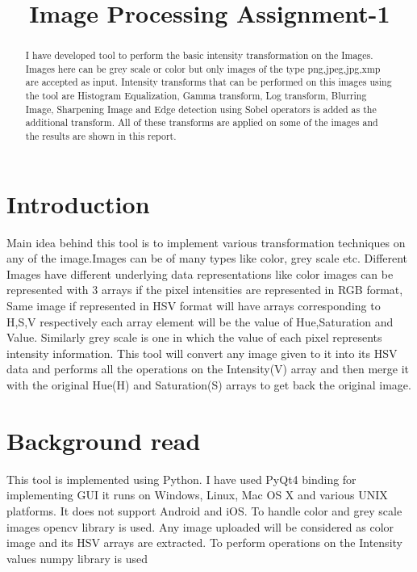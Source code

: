 \documentclass{article}
\title{Image Processing Assignment-1}
\begin{document}
%
\maketitle
%
\begin{abstract}
I have developed tool to perform the basic intensity transformation on the Images. Images here can be grey scale or color but only images of the type png,jpeg,jpg,xmp are accepted as input. Intensity transforms that can be performed on this images using the tool are Histogram Equalization, Gamma transform, Log transform, Blurring Image, Sharpening Image and Edge detection using Sobel operators is added as the additional transform. All of these transforms are applied on some of the images and the results are shown in this report.
\end{abstract}

\section{Introduction}
\label{sec:intro}
Main idea behind this tool is to implement various transformation techniques on any of the image.Images can be of many types like color, grey scale etc. Different Images have different underlying data representations like color images can be represented with 3 arrays if the pixel intensities are represented in RGB format, Same image if represented in HSV format will have arrays corresponding to H,S,V respectively each array element will be the value of Hue,Saturation and Value. Similarly grey scale  is one in which the value of each pixel represents intensity information. This tool will convert any image given to it into its HSV data and performs all the operations on the Intensity(V) array and then merge it with the original Hue(H) and Saturation(S) arrays to get back the original image. 


\section{Background read}
\label{sec:format}
This tool is implemented using Python\cite{WEBSITE:10}. I have used PyQt4\cite{WEBSITE:9} binding for implementing GUI it runs on Windows, Linux, Mac OS X and various UNIX platforms. It does not support Android and iOS. To handle color and grey scale images opencv\cite{WEBSITE:4} library is used. Any image uploaded will be considered as color image and its HSV arrays\cite{WEBSITE:2} are extracted. To perform operations on the Intensity values numpy\cite{WEBSITE:1} library is used  
\end{document}

